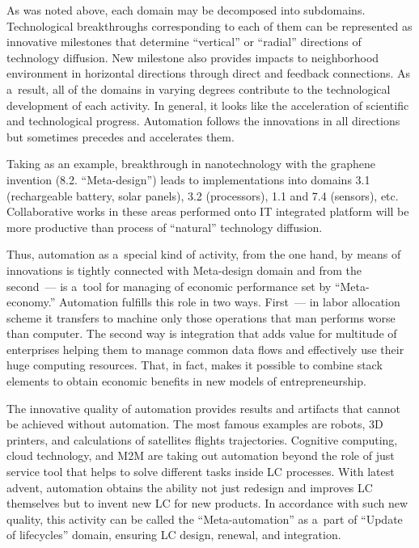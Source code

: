 \begin{multicols}{2}
 As was noted above, each domain may be decomposed into subdomains. Technological breakthroughs
corresponding to each of them can be represented as innovative milestones that determine ``vertical'' or
``radial'' directions of technology diffusion. New milestone also provides impacts to neighborhood
environment in horizontal directions through direct and feedback connections.  As a~result, all of the
domains in varying degrees contribute to the technological development of each activity. In general, it
looks like the acceleration of scientific and technological progress. Automation follows the innovations in
all directions but sometimes precedes and accelerates them.

 Taking as an example, breakthrough in nanotechnology with the graphene invention (8.2. ``Meta-design'')
leads to implementations into domains 3.1 (rechargeable battery, solar panels), 3.2 (processors), 1.1 and
7.4 (sensors), etc. Collaborative works in these areas performed onto IT integrated platform will be more
productive than process of ``natural'' technology diffusion.

 Thus, automation as a~special kind of activity, from the one hand, by means of innovations is tightly
connected with Meta-design domain and from the second~--- is a~tool for managing of economic performance
set by ``Meta-economy.'' Automation fulfills this role in two ways. First~--- in labor allocation scheme it
transfers to machine only those operations that man performs worse than computer. The second way is
integration that adds value for multitude of enterprises helping them to manage common data flows and
effectively use their huge computing resources. That, in fact, makes it possible to combine stack elements
to obtain economic benefits in new models of entrepreneurship.

 The innovative quality of automation provides results and artifacts
 that cannot be achieved without
automation. The most famous examples are robots, 3D printers, and calculations of satellites flights
trajectories.  Cognitive computing, cloud technology, and M2M are taking out automation beyond the role
of just service tool that helps to solve different tasks inside LC processes.
 With latest advent, automation
obtains the ability not just redesign and improves LC themselves but to invent new LC for new
products. In accordance with such new quality, this activity can be called
 the ``Meta-automation'' as
a~part of ``Update of lifecycles'' domain, ensuring LC design, renewal, and integration.


\end{multicols}
